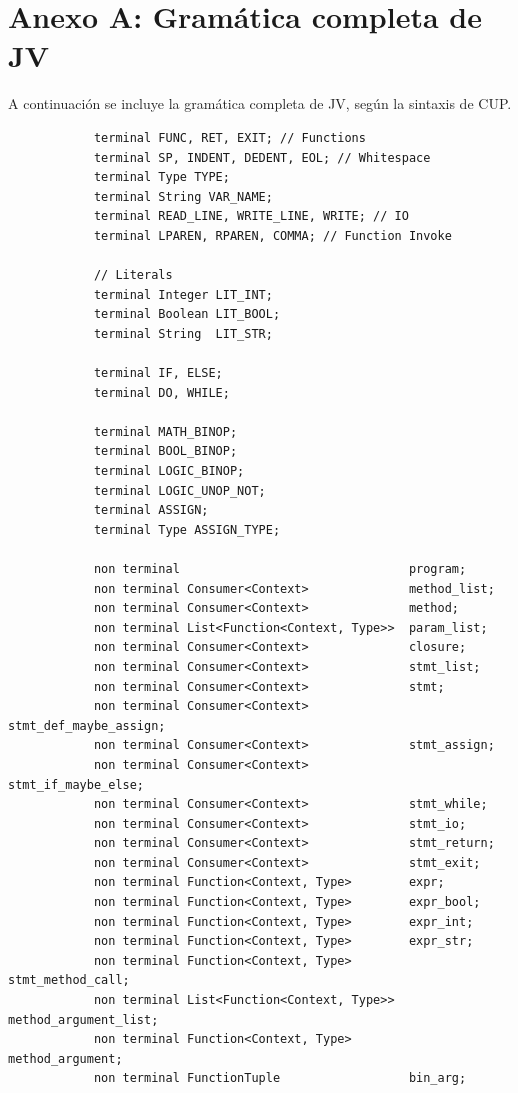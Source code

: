 \documentclass{article}
\begin{document}
    \section{Anexo A: Gramática completa de JV}
        \par A continuación se incluye la gramática completa de JV, según la sintaxis de CUP.
        \begin{lstlisting}
            terminal FUNC, RET, EXIT; // Functions
            terminal SP, INDENT, DEDENT, EOL; // Whitespace
            terminal Type TYPE;
            terminal String VAR_NAME;
            terminal READ_LINE, WRITE_LINE, WRITE; // IO
            terminal LPAREN, RPAREN, COMMA; // Function Invoke
            
            // Literals
            terminal Integer LIT_INT;
            terminal Boolean LIT_BOOL;
            terminal String  LIT_STR;
            
            terminal IF, ELSE;
            terminal DO, WHILE;
            
            terminal MATH_BINOP;
            terminal BOOL_BINOP;
            terminal LOGIC_BINOP;
            terminal LOGIC_UNOP_NOT;
            terminal ASSIGN;
            terminal Type ASSIGN_TYPE;
            
            non terminal                                program;
            non terminal Consumer<Context>              method_list;
            non terminal Consumer<Context>              method;
            non terminal List<Function<Context, Type>>  param_list;
            non terminal Consumer<Context>              closure;
            non terminal Consumer<Context>              stmt_list;
            non terminal Consumer<Context>              stmt;
            non terminal Consumer<Context>              stmt_def_maybe_assign;
            non terminal Consumer<Context>              stmt_assign;
            non terminal Consumer<Context>              stmt_if_maybe_else;
            non terminal Consumer<Context>              stmt_while;
            non terminal Consumer<Context>              stmt_io;
            non terminal Consumer<Context>              stmt_return;
            non terminal Consumer<Context>              stmt_exit;
            non terminal Function<Context, Type>        expr;
            non terminal Function<Context, Type>        expr_bool;
            non terminal Function<Context, Type>        expr_int;
            non terminal Function<Context, Type>        expr_str;
            non terminal Function<Context, Type>        stmt_method_call;
            non terminal List<Function<Context, Type>>  method_argument_list;
            non terminal Function<Context, Type>        method_argument;
            non terminal FunctionTuple                  bin_arg;
            

\end{lstlisting}
\end{document}
